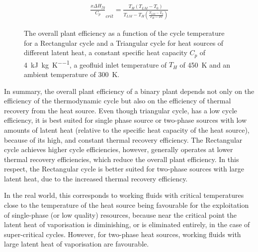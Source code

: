          \begin{align}
           \frac{x\Delta H_{fg}}{C_p}_{crit} = \frac{T_H(T_{LM}-T_0)}{T_{LM}-T_H\left(\frac{T_{LM}-T_0}{T_H-T0}\right)}  \label{eq:carnot_triangular_crit_point}
        \end{align}

        \begin{figure}[H]
            \centering
            
            \caption[The overall plant efficiency for different latent heats as a function of cycle temperature for a Rectangular and Triangular cycle.]{The overall plant efficiency as a function of the cycle temperature for a Rectangular cycle and a Triangular cycle for heat sources of different latent heat, a constant specific heat capacity \(C_p\) of \qty{4}{\kilo\joule\per\kg\per\K}, a geofluid inlet temperature of \(T_H\) of \qty{450}{\K} and an ambient temperature of \qty{300}{\K}.}
            \label{fig:litrev_GenericSource_Carnot_vs_Triangular}
        \end{figure}        

        In summary, the overall plant efficiency of a binary plant depends not only on the efficiency of the thermodynamic cycle but also on the efficiency of thermal recovery from the heat source. Even though triangular cycle, has a low cycle efficiency, it is best suited for single phase source or two-phase sources with low amounts of latent heat (relative to the specific heat capacity of the heat source), because of its high, and constant thermal recovery efficiency. The Rectangular cycle achieves higher cycle efficiencies, however, generally operates at lower thermal recovery efficiencies, which reduce the overall plant efficiency. In this respect, the Rectangular cycle is better suited for two-phase sources with large latent heat, due to the increased thermal recovery efficiency. 
        
        In the real world, this corresponds to working fluids with critical temperatures close to the temperature of the heat source being favourable for the exploitation of single-phase (or low quality) resources, because near the critical point the latent heat of vaporisation is diminishing, or is eliminated entirely, in the case of super-critical cycles. However, for two-phase heat sources, working fluids with large latent heat of vaporisation are favourable. 


